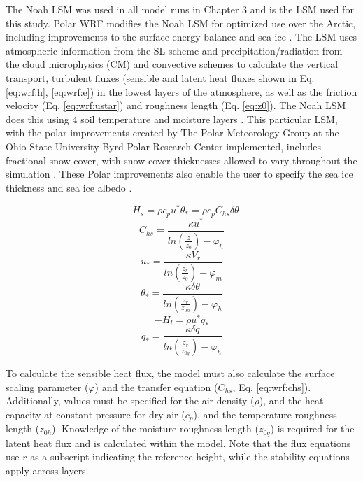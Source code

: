 The Noah LSM \citep{chen:2001} was used in all model runs in Chapter 3 and is the LSM used for this study. Polar WRF modifies the Noah LSM for optimized use over the Arctic, including improvements to the surface energy balance and sea ice \citep{hines:2015, bromwich:2009}. The LSM uses atmospheric information from the SL scheme and precipitation/radiation from the cloud microphysics (CM) and convective schemes to calculate the vertical transport, turbulent fluxes (sensible and latent heat fluxes shown in Eq. \ref{eq:wrf:h}, \ref{eq:wrf:e}) in the lowest layers of the atmosphere, as well as the friction velocity (Eq. \ref{eq:wrf:ustar}) and roughness length (Eq. \ref{eq:z0}). The Noah LSM does this using 4 soil temperature and moisture layers \citep{dudhia:2014, skamarock:2019}. This particular LSM, with the polar improvements created by The Polar Meteorology Group at the Ohio State University Byrd Polar Research Center implemented, includes fractional snow cover, with snow cover thicknesses allowed to vary throughout the simulation \cite{chen:2001}. These Polar improvements also enable the user to specify the sea ice thickness and sea ice albedo \citep{hines:2015}.

\begin{equation}\label{eq:wrf:h}
-H_{s} = \rho c_{p} u^{*} \theta_{*} = \rho c_{p} C_{hs} \delta \theta
\end{equation}
\begin{equation}\label{eq:wrf:chs}
C_{hs} = \frac{\kappa u^{*}}{ln (\frac{z}{z_{0}}) - \varphi_{h}}
\end{equation}
\begin{equation}\label{eq:wrf:ustar}
u_{*} = \frac{\kappa V_{r}}{ln(\frac{z_{r}}{z_{0}}) - \varphi_{m}}
\end{equation}
\begin{equation}\label{eq:wrf:thetastar}
\theta_{*} = \frac{\kappa \delta \theta}{ln(\frac{z_{r}}{z_{0h}}) - \varphi_{h}} 
\end{equation}
\begin{equation}\label{eq:wrf:e}
-H_{l} = \rho u^{*} q_{*}
\end{equation}
\begin{equation}\label{eq:wrf:q*}
q_{*} = \frac{\kappa \delta q}{ln(\frac{z_{r}}{z_{0q}}) - \varphi_{h}}
\end{equation}

To calculate the sensible heat flux, the model must also calculate the surface scaling parameter ($\varphi$) and the transfer equation ($C_{hs}$, Eq. \ref{eq:wrf:chs}). Additionally, values must be specified for the air density ($\rho$), and the heat capacity at constant pressure for dry air ($c_{p}$), and the temperature roughness length ($z_{0h}$). Knowledge of the moisture roughness length ($z_{0q}$) is required for the latent heat flux and is calculated within the model. Note that the flux equations use $r$ as a subscript indicating the reference height, while the stability equations apply across layers.

